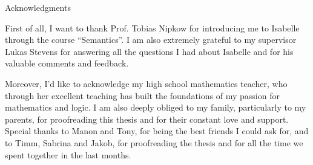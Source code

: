 \thispagestyle{empty}

\vspace*{20mm}

\begin{center}
{ Acknowledgments}
\end{center}

\vspace{10mm}

First of all, I want to thank Prof. Tobias Nipkow for introducing me to Isabelle through the course ``Semantics''.
I am also extremely grateful to my supervisor Lukas Stevens for answering all the questions I had about Isabelle and for his valuable comments and feedback.

Moreover, I'd like to acknowledge my high school mathematics teacher, who through her excellent teaching has built the foundations of my passion for mathematics and logic.
I am also deeply obliged to my family, particularly to my parents, for proofreading this thesis and for their constant love and support.
Special thanks to Manon and Tony, for being the best friends I could ask for, and to Timm, Sabrina and Jakob, for proofreading the thesis and for all the time we spent together in the last months.





\cleardoublepage{}
